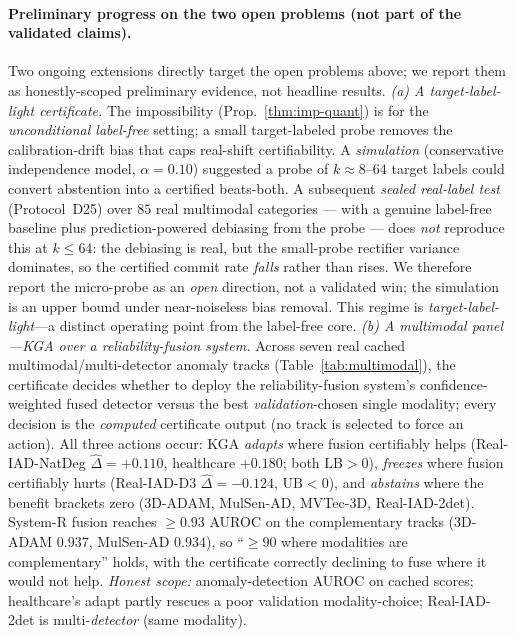 \documentclass[conference]{IEEEtran}
\theoremstyle{plain}
\theoremstyle{definition}
\begin{document}
\paragraph{Preliminary progress on the two open problems (not part of the validated claims).}
Two ongoing extensions directly target the open problems above; we report them as honestly-scoped
preliminary evidence, not headline results.
\emph{(a) A target-label-light certificate.} The impossibility (Prop.~\ref{thm:imp-quant}) is for the
\emph{unconditional label-free} setting; a small target-labeled probe removes the calibration-drift
bias that caps real-shift certifiability. A \emph{simulation} (conservative independence model, $\alpha{=}0.10$) suggested a probe of
$k{\approx}8$--$64$ target labels could convert abstention into a certified beats-both. A subsequent
\emph{sealed real-label test} (Protocol~D25) over $85$ real multimodal categories --- with a genuine
label-free baseline plus prediction-powered debiasing from the probe --- does \emph{not} reproduce
this at $k{\le}64$: the debiasing is real, but the small-probe rectifier variance dominates, so the
certified commit rate \emph{falls} rather than rises. We therefore report the micro-probe as an
\emph{open} direction, not a validated win; the simulation is an upper bound under near-noiseless bias
removal. This regime is \emph{target-label-light}---a distinct operating point from the label-free
core.
\emph{(b) A multimodal panel---\textsc{KGA} over a reliability-fusion system.} Across seven real cached
multimodal/multi-detector anomaly tracks (Table~\ref{tab:multimodal}), the certificate decides whether
to deploy the reliability-fusion system's confidence-weighted fused detector versus the best \emph{validation}-chosen
single modality; every decision is the \emph{computed} certificate output (no track is selected to force
an action). All three actions occur: \textsc{KGA} \emph{adapts} where fusion certifiably helps
(Real-IAD-NatDeg $\hat\Delta{=}{+}0.110$, healthcare ${+}0.180$; both $\mathrm{LB}{>}0$), \emph{freezes}
where fusion certifiably hurts (Real-IAD-D3 $\hat\Delta{=}{-}0.124$, $\mathrm{UB}{<}0$), and
\emph{abstains} where the benefit brackets zero (3D-ADAM, MulSen-AD, MVTec-3D, Real-IAD-2det). System-R
fusion reaches $\ge0.93$ AUROC on the complementary tracks (3D-ADAM $0.937$, MulSen-AD $0.934$), so
``$\ge90$ where modalities are complementary'' holds, with the certificate correctly declining to fuse
where it would not help. \emph{Honest scope:} anomaly-detection AUROC on cached scores; healthcare's
adapt partly rescues a poor validation modality-choice; Real-IAD-2det is multi-\emph{detector} (same
modality).
\end{document}
